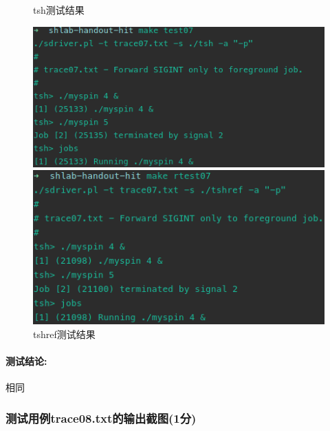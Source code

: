 \begin{figure}[H]
    \begin{minipage}[c]{0.5\linewidth}
        \centering
        \caption{tsh测试结果}
        \includegraphics[width=0.7\linewidth]{figures/test07.png}
    \end{minipage}
    \begin{minipage}[c]{0.5\linewidth}
        \centering
        \caption{tshref测试结果}
        \includegraphics[width=0.7\linewidth]{figures/rtest07.png}
    \end{minipage}
\end{figure}

\paragraph{测试结论:}相同

\subsubsection{测试用例trace08.txt的输出截图(1分)}

